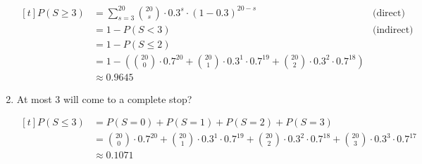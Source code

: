 \begin{example}
\begin{enumerate}[label=\alph*)]
        $\begin{aligned}[t]
            P(S \ge 3)
             & = \sum_{s = 3}^{20} \binom{20}{s} \cdot 0.3^s \cdot (1 - 0.3)^{20-s}                                                                    & \text{(direct)}   \\
             & = 1 - P(S < 3)                                                                                                                          & \text{(indirect)} \\
             & = 1 - P(S \le 2)                                                                                                                                            \\
             & = 1 - \left( \binom{20}{0} \cdot 0.7^{20} + \binom{20}{1} \cdot 0.3^1 \cdot 0.7^{19} + \binom{20}{2} \cdot 0.3^2 \cdot 0.7^{18} \right)                     \\
             & \approx 0.9645
        \end{aligned}$

        \item At most $3$ will come to a complete stop?
        
        $\begin{aligned}[t]
            P(S \le 3) & = P(S = 0) + P(S = 1) + P(S = 2) + P(S = 3)                                                                                                                     \\
                       & = \binom{20}{0} \cdot 0.7^{20} + \binom{20}{1} \cdot 0.3^1 \cdot 0.7^{19} + \binom{20}{2} \cdot 0.3^2 \cdot 0.7^{18} + \binom{20}{3} \cdot 0.3^3 \cdot 0.7^{17} \\
                       & \approx 0.1071
        \end{aligned}$
    \end{enumerate}
\end{example}

